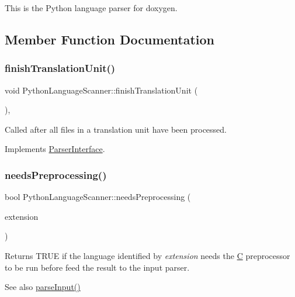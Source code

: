 This is the Python language parser for doxygen. 

\subsection{Member Function Documentation}
\mbox{\label{class_python_language_scanner_a97ca623055615c143e63ea98be819f86}} 
\subsubsection{\texorpdfstring{finishTranslationUnit()}{finishTranslationUnit()}}
{\footnotesize\ttfamily void Python\+Language\+Scanner\+::finish\+Translation\+Unit (\begin{DoxyParamCaption}{ }\end{DoxyParamCaption})\hspace{0.3cm}{\ttfamily [inline]}, {\ttfamily [virtual]}}

Called after all files in a translation unit have been processed. 

Implements \mbox{\hyperlink{class_parser_interface_af3acd64c6a33852e2e46e7288eb9c9cf}{Parser\+Interface}}.

\mbox{\label{class_python_language_scanner_a7c6ce0a95e477374182374a9f5bb2e2f}} 
\subsubsection{\texorpdfstring{needsPreprocessing()}{needsPreprocessing()}}
{\footnotesize\ttfamily bool Python\+Language\+Scanner\+::needs\+Preprocessing (\begin{DoxyParamCaption}\item[{const \mbox{\hyperlink{class_q_c_string}{Q\+C\+String}} \&}]{extension }\end{DoxyParamCaption})\hspace{0.3cm}{\ttfamily [virtual]}}

Returns T\+R\+UE if the language identified by {\itshape extension} needs the \mbox{\hyperlink{class_c}{C}} preprocessor to be run before feed the result to the input parser. \begin{DoxySeeAlso}{See also}
\mbox{\hyperlink{class_python_language_scanner_a6848c585fe2a19cd36ed34540dc3fdce}{parse\+Input()}} 
\end{DoxySeeAlso}


